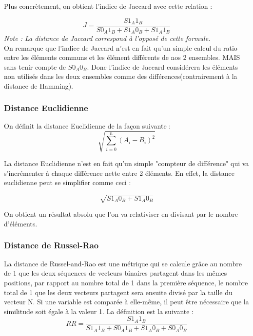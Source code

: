 \documentclass[a4paper, 12pt, twoside]{article}
\begin{document}
Plus concrètement, on obtient l'indice de Jaccard avec cette relation :

\begin{equation}
  J =\frac{ S1_{A}1_{B} }{S0_{A}1_{B}+S1_{A}0_{B}+S1_{A}1_{B}}
\end{equation}
\textit{Note : La distance de Jaccard correspond à l'opposé de cette formule.}
\\


On remarque que l'indice de Jaccard n'est en fait qu'un simple calcul du ratio entre les éléments communs et les élément différents de nos 2 ensembles. MAIS sans tenir compte de $S0_{A}0_{B}$. Donc l'indice de Jaccard considérera les éléments non utilisés dans les deux ensembles comme des différences(contrairement à la distance de Hamming).




\subsubsection{Distance Euclidienne}

On définit la distance Euclidienne de la façon suivante :
\begin{equation}
 \sqrt{\sum_{i=0}^n (A_{i}-B_{i})^2}
\end{equation}

La distance Euclidienne n'est en fait qu'un simple "compteur de différence" qui va s'incrémenter à chaque différence nette entre 2 éléments. En effet, la distance euclidienne peut se simplifier comme ceci :

\begin{equation}
 \sqrt{S1_{A}0_{B}+S1_{A}0_{B}}
\end{equation}

On obtient un résultat absolu que l'on va relativiser en divisant par le nombre d'éléments.

\subsubsection{Distance de Russel-Rao}
La distance de Russel-and-Rao est une métrique qui se calcule grâce au nombre de 1 que les deux séquences  de vecteurs binaires partagent dans les mêmes positions, par rapport au nombre total de 1 dans la première séquence, le nombre total de 1 que les deux vecteurs partagent sera ensuite divisé par la taille du vecteur N.  Si une variable est comparée à elle-même, il peut être nécessaire que la similitude soit égale à la valeur 1.
La définition est la suivante :
\begin{equation}
   RR = \frac{S1_{A}1_{B}}{S1_{A}1_{B} + S0_{A}1_{B}+S1_{A}0_{B} + S0_{A}0_{B}}
\end{equation}
\end{document}
